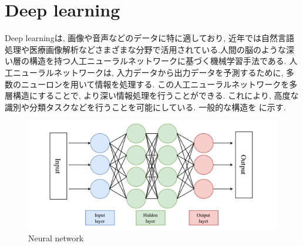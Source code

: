 
\section{Deep learning}
Deep learningは, 画像や音声などのデータに特に適しており, 近年では自然言語処理や医療画像解析などさまざまな分野で活用されている.人間の脳のような深い層の構造を持つ人工ニューラルネットワークに基づく機械学習手法である. 人工ニューラルネットワークは, 入力データから出力データを予測するために, 多数のニューロンを用いて情報を処理する. この人工ニューラルネットワークを多層構造にすることで, より深い情報処理を行うことができる. これにより, 高度な識別や分類タスクなどを行うことを可能にしている. 一般的な構造を  に示す.


\begin{figure}[hbtp]
  \centering
 \includegraphics[keepaspectratio, scale=0.4]
      {images/deeplearning_model.png}
 \caption{Neural network}
 \label{Fig:Neural network}
\end{figure}

\newpage
